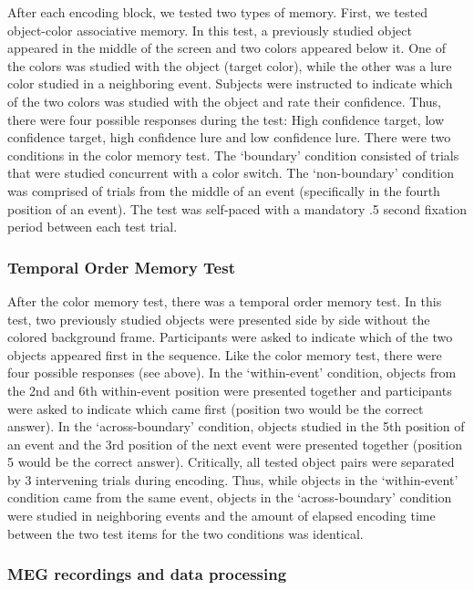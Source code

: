 After each encoding block, we tested two types of memory. First, we
tested object-color associative memory. In this test, a previously
studied object appeared in the middle of the screen and two colors
appeared below it. One of the colors was studied with the object (target
color), while the other was a lure color studied in a neighboring event.
Subjects were instructed to indicate which of the two colors was studied
with the object and rate their confidence. Thus, there were four
possible responses during the test: High confidence target, low
confidence target, high confidence lure and low confidence lure. There
were two conditions in the color memory test. The `boundary' condition
consisted of trials that were studied concurrent with a color switch.
The `non-boundary' condition was comprised of trials from the middle of
an event (specifically in the fourth position of an event). The test was
self-paced with a mandatory .5 second fixation period between each test
trial.

\subsubsection{Temporal Order Memory
Test}\label{temporal-order-memory-test}

After the color memory test, there was a temporal order memory test. In
this test, two previously studied objects were presented side by side
without the colored background frame. Participants were asked to
indicate which of the two objects appeared first in the sequence. Like
the color memory test, there were four possible responses (see above).
In the `within-event' condition, objects from the 2nd and 6th
within-event position were presented together and participants were
asked to indicate which came first (position two would be the correct
answer). In the `across-boundary' condition, objects studied in the 5th
position of an event and the 3rd position of the next event were
presented together (position 5 would be the correct answer). Critically,
all tested object pairs were separated by 3 intervening trials during
encoding. Thus, while objects in the `within-event' condition came from
the same event, objects in the `across-boundary' condition were studied
in neighboring events and the amount of elapsed encoding time between
the two test items for the two conditions was identical.

\subsubsection{MEG recordings and data
processing}\label{meg-recordings-and-data-processing}

